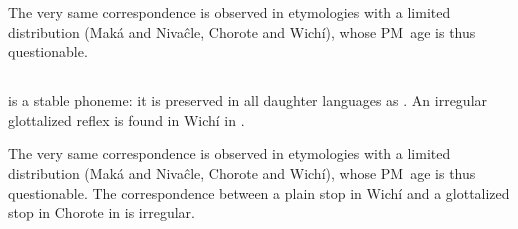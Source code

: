 The very same correspondence is observed in etymologies with a limited distribution (Maká and Nivaĉle, Chorote and Wichí), whose PM~age is thus questionable.

\begin{exe}
    \ex \hunger
    \ex \heel
    \ex \frog
    \ex \cook
    \ex \orphancw
    \ex \skycloud
    \ex \drum
    \ex \dwarf
    \ex \dovesipup
    \ex \ashamedmn
\end{exe}

\subsection{}\label{proto-t}
 is a stable phoneme: it is preserved in all daughter languages as . An irregular glottalized reflex is found in Wichí in .

\begin{exe}
    \ex \fallonitsown
    \ex \wordamet
    \ex \bleedv
    \ex \drinkn
    \ex \jar
    \ex \fatv
    \ex \firef
    \ex \rootn
    \ex \coldweather
    \ex \elbow
    \ex \fart
    \ex \water
    \ex \grove
    \ex \fall
    \ex \cactus
    \ex \eldersis
    \ex \meet
    \ex \barnowl
    \ex \thorncutjan
    \ex \flee
    \ex \squash
    \ex \iscayante
    \ex \firewoodlhet
    \ex {}
    \ex \hither
    \ex \sleepiness
    \ex \mucus
    \ex \snore
    \ex \cavy
    \ex \lippaset
    \ex \shuck
    \ex \deep
    \ex \longv
    \ex \fillv
    \ex \tapeti
    \ex \lid
    \ex \starn
    \ex \vein
    \ex \mesh
    \ex \whitequebracho
    \ex \kingvulture
    \ex \cat
    \ex \thunder \label{t-thunder}
    \ex \pseudo
    \ex \acquainted
    \ex \sprout
    \ex \dinlaw
    \ex \eyelash
    \ex \abdcavity
    \ex \basetrunk
    \ex \trunk
    \ex \eye
    \ex \river
    \ex \spinsew
    \ex \plate
    \ex \face
    \ex \eyebrow
    \ex \blind
    \ex \snake
    \ex \far
    \ex \ant
    \ex \yellowlegs
    \ex \uncle
    \ex \tooth
    \ex \tsofatajf
    \ex \tsofatajt
    \ex \paloflojof
    \ex \placen
    \ex \headn
    \ex \tuscaf
    \ex \tuscat
    \ex \tuscag
    \ex \earth
    \ex \sandyplace
    \ex \pushv
    \ex \snakeatuj
    \ex \femalebreast
    \ex \hurt
    \ex \argentineboa
    \ex \waspaniti
    \ex \wildpepper
    \ex \firei
    \ex \chest
\end{exe}

The very same correspondence is observed in etymologies with a limited distribution (Maká and Nivaĉle, Chorote and Wichí), whose PM~age is thus questionable. The correspondence between a plain stop in Wichí and a glottalized stop in Chorote in  is irregular.

